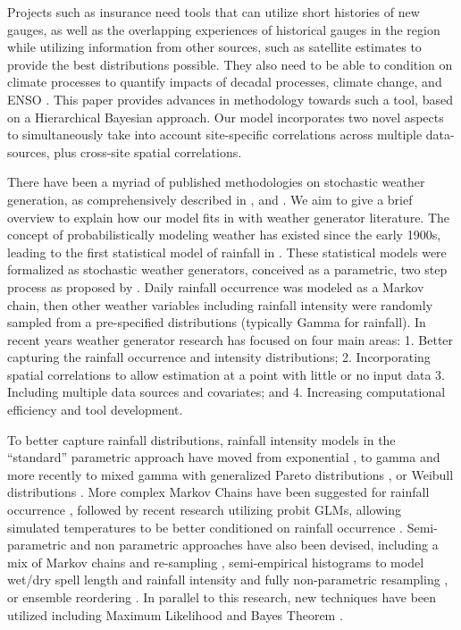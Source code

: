 \documentclass[11pt]{article}
\begin{document}
Projects such as insurance need tools that can utilize short histories of new gauges, as well as the overlapping experiences of historical gauges in the region while utilizing information from other sources, such as satellite estimates to provide the best distributions possible.  They also need to be able to condition on climate processes to quantify impacts of decadal processes, climate change, and ENSO \cite{Bell2013}.   This paper provides advances in methodology towards such a tool, based on a Hierarchical Bayesian approach.  Our model incorporates two novel aspects to simultaneously take into account site-specific correlations across multiple data-sources, plus cross-site spatial correlations.

There have been a myriad of published methodologies on stochastic weather generation, as comprehensively described in \cite{Wilks1999}, \cite{Sanso2000} and \cite{Verdin2015}.   We aim to give a brief overview to explain how our model fits in with weather generator literature.  The concept of probabilistically modeling weather has existed since the early 1900s, leading to the first statistical model of rainfall in \cite{Gabriel1962}.  These statistical models were formalized as stochastic weather generators, conceived as a parametric, two step process as proposed by \cite{Richardson1981}.  Daily rainfall occurrence was modeled as a Markov chain, then other weather variables including rainfall intensity were randomly sampled from a pre-specified distributions (typically Gamma for rainfall).   In recent years weather generator research has focused on four main areas: 1. Better capturing the rainfall occurrence and intensity distributions; 2. Incorporating spatial correlations to allow estimation at a point with little or no input data 3. Including multiple data sources and covariates; and 4. Increasing computational efficiency and tool development.  

To better capture rainfall distributions, rainfall intensity models in the ``standard'' parametric approach have moved from exponential \cite{Richardson1981}, to gamma \cite{Thom1958, Katz1977, Buishand1978, Coe1984, Wilks1992} and more recently to mixed gamma with generalized Pareto distributions \cite{Lennartsson2008}, or Weibull distributions \cite{Wilks1989, Furrer2008}.  More complex  Markov Chains have been suggested for rainfall occurrence \cite{Jones1993, Dastidar2010}, followed by recent research utilizing probit GLMs, allowing simulated temperatures to be better conditioned on rainfall occurrence \cite{Verdin2015}. Semi-parametric and non parametric approaches have also been devised, including a mix of Markov chains and re-sampling \cite{Apipattanavis2007}, semi-empirical histograms to model wet/dry spell length and rainfall intensity \cite{Racsko1991, Semenov2008} and fully non-parametric resampling \cite{Young1994,Lall1996, Rajagopalan1999}, or ensemble reordering \cite{Ghile2009}. In parallel to this research, new techniques have been utilized including Maximum Likelihood \cite{Fasso2011} and Bayes Theorem \cite{Sanso2000}.
\end{document}
